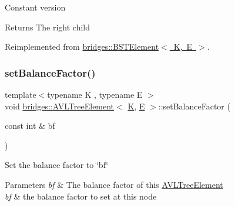 Constant version

\begin{DoxyReturn}{Returns}
The right child 
\end{DoxyReturn}


Reimplemented from \mbox{\hyperlink{classbridges_1_1_b_s_t_element_ae4e7b750eada97074a42e7f54b320a29}{bridges\+::\+B\+S\+T\+Element$<$ K, E $>$}}.

\mbox{\label{classbridges_1_1_a_v_l_tree_element_a076ec482874d248764348e62dd4652d2}} 
\subsubsection{\texorpdfstring{setBalanceFactor()}{setBalanceFactor()}}
{\footnotesize\ttfamily template$<$typename K , typename E $>$ \\
void \mbox{\hyperlink{classbridges_1_1_a_v_l_tree_element}{bridges\+::\+A\+V\+L\+Tree\+Element}}$<$ \mbox{\hyperlink{namespacebridges_acfb0a4f7877d8f63de3e6862004c50edaa5f3c6a11b03839d46af9fb43c97c188}{K}}, \mbox{\hyperlink{namespacebridges_acfb0a4f7877d8f63de3e6862004c50eda3a3ea00cfc35332cedf6e5e9a32e94da}{E}} $>$\+::set\+Balance\+Factor (\begin{DoxyParamCaption}\item[{const int \&}]{bf }\end{DoxyParamCaption})\hspace{0.3cm}{\ttfamily [inline]}}

Set the balance factor to \char`\"{}bf\char`\"{}
\begin{DoxyParams}{Parameters}
{\em bf} & The balance factor of this \mbox{\hyperlink{classbridges_1_1_a_v_l_tree_element}{A\+V\+L\+Tree\+Element}}\\
\hline
{\em bf} & the balance factor to set at this node \\
\hline
\end{DoxyParams}
\mbox{\label{classbridges_1_1_a_v_l_tree_element_acbf2a222b954e5d9221b109634822f96}} 
